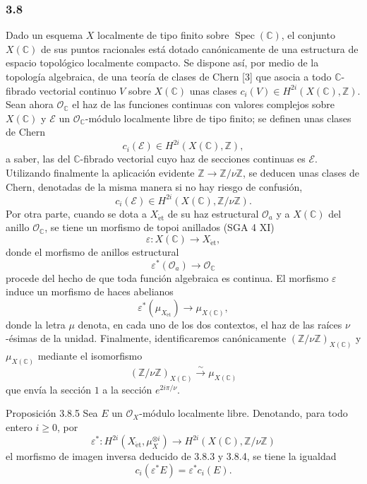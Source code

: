 \subsubsection*{3.8}
Dado un esquema $X$ localmente de tipo finito sobre $\operatorname{Spec}(\mathbb C)$, el conjunto $X(\mathbb C)$ de sus puntos racionales está dotado canónicamente de una estructura de espacio topológico localmente compacto. Se dispone así, por medio de la topología algebraica, de una teoría de clases de Chern [3] que asocia a todo $\mathbb C$-fibrado vectorial continuo $V$ sobre $X(\mathbb C)$ unas clases $c_i(V)\in H^{2i}(X(\mathbb C),\mathbb Z)$. Sean ahora $\mathcal O_\mathbb C$ el haz de las funciones continuas con valores complejos sobre $X(\mathbb C)$ y $\mathcal E$ un $\mathcal O_\mathbb C$-módulo localmente libre de tipo finito; se definen unas clases de Chern
\[
c_i(\mathcal E)\in H^{2i}(X(\mathbb C),\mathbb Z),
\]
a saber, las del $\mathbb C$-fibrado vectorial cuyo haz de secciones continuas es $\mathcal E$. Utilizando finalmente la aplicación evidente $\mathbb Z\to\mathbb Z/\nu\mathbb Z$, se deducen unas clases de Chern, denotadas de la misma manera si no hay riesgo de confusión,
\[
c_i(\mathcal E)\in H^{2i}(X(\mathbb C),\mathbb Z/\nu\mathbb Z).
\tag{3.8.1}
\]
Por otra parte, cuando se dota a $X_{\mathrm{\acute et}}$ de su haz estructural $\mathcal O_a$ y a $X(\mathbb C)$ del anillo $\mathcal O_\mathbb C$, se tiene un morfismo de topoi anillados (SGA 4 XI)
\[
\varepsilon:X(\mathbb C)\to X_{\mathrm{\acute et}},
\]
donde el morfismo de anillos estructural
\[
\varepsilon^*(\mathcal O_a)\to\mathcal O_\mathbb C
\tag{3.8.2}
\]
procede del hecho de que toda función algebraica es continua. El morfismo $\varepsilon$ induce un morfismo de haces abelianos
\[
\varepsilon^*(\mu_{X_{\mathrm{\acute et}}})\to \mu_{X(\mathbb C)},
\tag{3.8.3}
\]
donde la letra $\mu$ denota, en cada uno de los dos contextos, el haz de las raíces $\nu$-ésimas de la unidad. Finalmente, identificaremos canónicamente $(\mathbb Z/\nu\mathbb Z)_{X(\mathbb C)}$ y $\mu_{X(\mathbb C)}$ mediante el isomorfismo
\[
(\mathbb Z/\nu\mathbb Z)_{X(\mathbb C)}
 \xrightarrow{\sim}\mu_{X(\mathbb C)}
\tag{3.8.4}
\]
que envía la sección $1$ a la sección $e^{2i\pi/\nu}$.

\begin{statement}{Proposición 3.8.5}
Sea $E$ un $\mathcal O_X$-módulo localmente libre. Denotando, para todo entero $i\ge0$, por
\[
\varepsilon^*:H^{2i}(X_{\mathrm{\acute et}},\mu_X^{\otimes i})
\to H^{2i}(X(\mathbb C),\mathbb Z/\nu\mathbb Z)
\]
el morfismo de imagen inversa deducido de 3.8.3 y 3.8.4, se tiene la igualdad
\[
c_i(\varepsilon^*E)=\varepsilon^*c_i(E).
\]
\end{statement}
